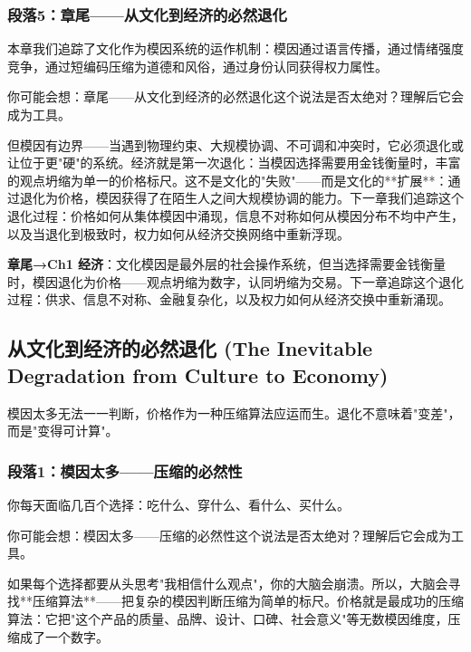 \documentclass[openany, a4paper, 12pt]{book}
\newenvironment{motivation}{
	\vspace{0.5em}
	\begin{tcolorbox}[
		colback=gray!10,           %
		colframe=gray!60,          %
		title=\textit{本章动机 (Motivation)},
		fonttitle=\bfseries,
		arc=0mm,                   %
		leftrule=3mm               %
		]
		\small \itshape %
	}{
	\end{tcolorbox}
	\vspace{1em}
}
\begin{document}
\begin{motivation}
\begin{motivation}
\begin{motivation}
	\subsubsection*{段落5：章尾——从文化到经济的必然退化}
	本章我们追踪了文化作为模因系统的运作机制：模因通过语言传播，通过情绪强度竞争，通过短编码压缩为道德和风俗，通过身份认同获得权力属性。
	\begin{tcolorbox}[colback=yellow!5, title=\textit{读者行为预测}]
		你可能会想：章尾——从文化到经济的必然退化这个说法是否太绝对？理解后它会成为工具。
	\end{tcolorbox}

但模因有边界——当遇到物理约束、大规模协调、不可调和冲突时，它必须退化或让位于更"硬"的系统。经济就是第一次退化：当模因选择需要用金钱衡量时，丰富的观点坍缩为单一的价格标尺。这不是文化的"失败"——而是文化的**扩展**：通过退化为价格，模因获得了在陌生人之间大规模协调的能力。下一章我们追踪这个退化过程：价格如何从集体模因中涌现，信息不对称如何从模因分布不均中产生，以及当退化到极致时，权力如何从经济交换网络中重新浮现。

	\textbf{章尾→Ch1 经济}：文化模因是最外层的社会操作系统，但当选择需要金钱衡量时，模因退化为价格——观点坍缩为数字，认同坍缩为交易。下一章追踪这个退化过程：供求、信息不对称、金融复杂化，以及权力如何从经济交换中重新涌现。



	\subsection{从文化到经济的必然退化 (The Inevitable Degradation from Culture to Economy)}
	\begin{motivation}
		模因太多无法一一判断，价格作为一种压缩算法应运而生。退化不意味着"变差"，而是"变得可计算"。
	\end{motivation}

	\subsubsection*{段落1：模因太多——压缩的必然性}
	你每天面临几百个选择：吃什么、穿什么、看什么、买什么。
	\begin{tcolorbox}[colback=yellow!5, title=\textit{读者行为预测}]
		你可能会想：模因太多——压缩的必然性这个说法是否太绝对？理解后它会成为工具。
	\end{tcolorbox}

如果每个选择都要从头思考"我相信什么观点"，你的大脑会崩溃。所以，大脑会寻找**压缩算法**——把复杂的模因判断压缩为简单的标尺。价格就是最成功的压缩算法：它把"这个产品的质量、品牌、设计、口碑、社会意义"等无数模因维度，压缩成了一个数字。


\end{motivation}
\end{motivation}
\end{motivation}
\end{document}
